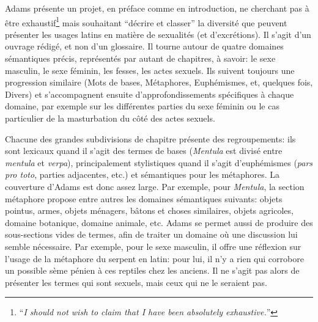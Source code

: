 Adams présente un projet, en préface comme en introduction, ne cherchant pas à être exhaustif\footnote{\enquote{\textit{I should
not wish to claim that I have been absolutely exhaustive.}}\textcite[Preface, p.~1]{adams}} mais souhaitant \enquote{décrire et classer} la diversité que peuvent présenter les usages latins en matière de sexualités (et d'excrétions). Il s'agit d'un ouvrage rédigé, et non d'un glossaire. Il tourne autour de quatre domaines sémantiques précis, représentés par autant de chapitres, à savoir: le sexe masculin, le sexe féminin, les fesses, les actes sexuels. Ils suivent toujours une progression similaire (Mots de bases, Métaphores, Euphémismes, et, quelques fois, Divers) et s'accompagnent ensuite d'approfondissements spécifiques à chaque domaine, par exemple sur les différentes parties du sexe féminin ou le cas particulier de la masturbation du côté des actes sexuels.


Chacune des grandes subdivisions de chapitre présente des regroupements: ils sont lexicaux quand il s'agit des termes de bases (\textit{Mentula} est divisé entre \textit{mentula} et \textit{verpa}), principalement stylistiques quand il s'agit d'euphémismes (\textit{pars pro toto}, parties adjacentes, etc.) et sémantiques pour les métaphores. La couverture d'Adams est donc assez large. Par exemple, pour \textit{Mentula}, la section métaphore propose entre autres les domaines sémantiques suivants: objets pointus, armes, objets ménagers, bâtons et choses similaires, objets agricoles, domaine botanique, domaine animale, etc. Adams se permet aussi de produire des sous-sections vides de termes, afin de traiter un domaine où une discussion lui semble nécessaire. Par exemple, pour le sexe masculin, il offre une réflexion sur l'usage de la métaphore du serpent en latin: pour lui, il n'y a rien qui corrobore un possible sème pénien à ces reptiles chez les anciens. Il ne s'agit pas alors de présenter les termes qui sont sexuels, mais ceux qui ne le seraient pas.




